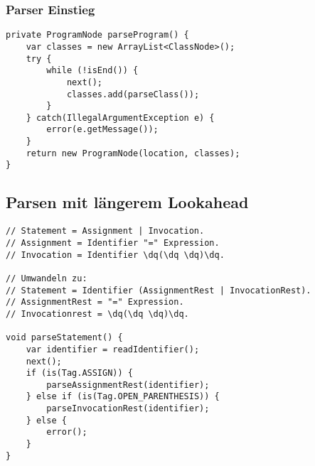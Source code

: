 \subsubsection{Parser Einstieg}
\begin{lstlisting}
private ProgramNode parseProgram() {
    var classes = new ArrayList<ClassNode>();
    try {
        while (!isEnd()) {
            next();
            classes.add(parseClass());
        }
    } catch(IllegalArgumentException e) {
        error(e.getMessage());
    }
    return new ProgramNode(location, classes);
}
\end{lstlisting}

\subsection{Parsen mit längerem Lookahead}
\begin{lstlisting}
// Statement = Assignment | Invocation.
// Assignment = Identifier "=" Expression.
// Invocation = Identifier \dq(\dq \dq)\dq.

// Umwandeln zu:
// Statement = Identifier (AssignmentRest | InvocationRest).
// AssignmentRest = "=" Expression.
// Invocationrest = \dq(\dq \dq)\dq.

void parseStatement() {
    var identifier = readIdentifier();
    next();
    if (is(Tag.ASSIGN)) {
        parseAssignmentRest(identifier);
    } else if (is(Tag.OPEN_PARENTHESIS)) {
        parseInvocationRest(identifier);
    } else {
        error();
    }
}
\end{lstlisting}
